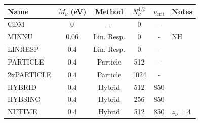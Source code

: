 \documentclass[useAMS, usenatbib]{mnras}
\begin{document}
\begin{table}
\begin{center}
\begin{tabular}{|l|c|c|c|c|l|}
\hline
    Name & $M_\nu$ (eV) & Method & $N_\nu^{1/3}$ & $v_\mathrm{crit}$ & Notes \\
\hline
CDM    &       0             &    -          & 0         & - &    \\
MINNU    &     0.06            &   Lin. Resp.    & 0         & - &  NH  \\
LINRESP    &     0.4             &   Lin. Resp.    & 0         & - &    \\
PARTICLE    &     0.4             &   Particle    & 512       & - &    \\
2xPARTICLE    &     0.4             &   Particle    & 1024 & - &    \\
HYBRID    &     0.4             &   Hybrid      & 512       & 850 & \\
HYBSING    &     0.4             &   Hybrid      & 256       & 850 & \\
NUTIME    &     0.4             &   Hybrid      & 512       & 850 & $z_\nu = 4$  \\

\end{tabular}
\end{center}
\end{table}
\end{document}
